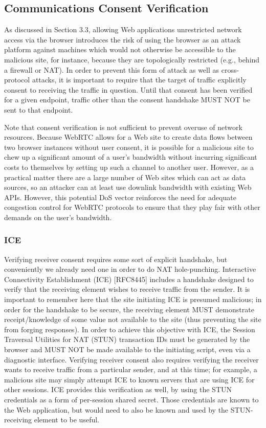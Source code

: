 \documentclass{article}
\begin{document}
\subsection{Communications Consent Verification}

As discussed in Section 3.3, allowing Web applications unrestricted
network access via the browser introduces the risk of using the
browser as an attack platform against machines which would not
otherwise be accessible to the malicious site, for instance, because
they are topologically restricted (e.g., behind a firewall or NAT).
In order to prevent this form of attack as well as cross-protocol
attacks, it is important to require that the target of traffic
explicitly consent to receiving the traffic in question.  Until that
consent has been verified for a given endpoint, traffic other than
the consent handshake MUST NOT be sent to that endpoint.

Note that consent verification is not sufficient to prevent overuse
of network resources.  Because WebRTC allows for a Web site to create
data flows between two browser instances without user consent, it is
possible for a malicious site to chew up a significant amount of a
user's bandwidth without incurring significant costs to themselves by
setting up such a channel to another user.  However, as a practical
matter there are a large number of Web sites which can act as data
sources, so an attacker can at least use downlink bandwidth with
existing Web APIs.  However, this potential DoS vector reinforces the
need for adequate congestion control for WebRTC protocols to ensure
that they play fair with other demands on the user's bandwidth.

\subsubsection{ICE}

Verifying receiver consent requires some sort of explicit handshake,
but conveniently we already need one in order to do NAT hole-punching.
Interactive Connectivity Establishment (ICE) [RFC8445]
includes a handshake designed to verify that the receiving element
wishes to receive traffic from the sender.  It is important to
remember here that the site initiating ICE is presumed malicious; in
order for the handshake to be secure, the receiving element MUST
demonstrate receipt/knowledge of some value not available to the site
(thus preventing the site from forging responses).  In order to
achieve this objective with ICE, the Session Traversal Utilities for
NAT (STUN) transaction IDs must be generated by the browser and MUST
NOT be made available to the initiating script, even via a diagnostic
interface.  Verifying receiver consent also requires verifying the
receiver wants to receive traffic from a particular sender, and at
this time; for example, a malicious site may simply attempt ICE to
known servers that are using ICE for other sessions.  ICE provides
this verification as well, by using the STUN credentials as a form of
per-session shared secret.  Those credentials are known to the Web
application, but would need to also be known and used by the STUN-receiving
element to be useful.
\end{document}
